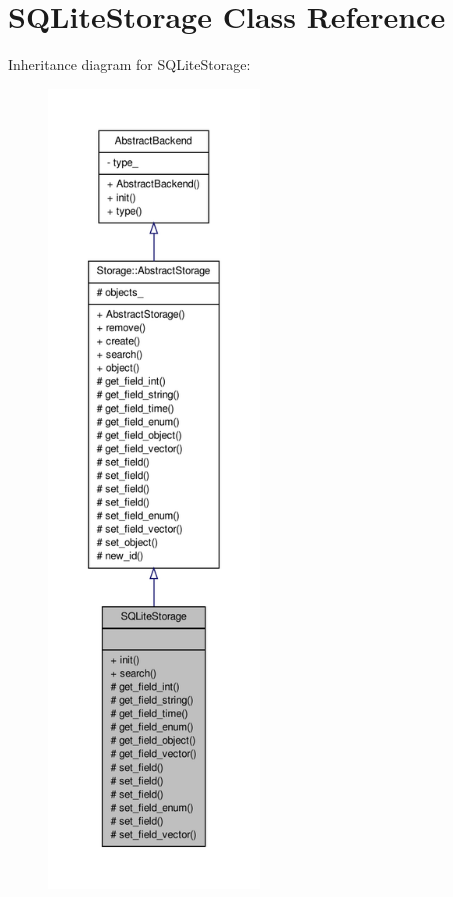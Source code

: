 \hypertarget{classSQLiteStorage}{
\section{SQLiteStorage Class Reference}
\label{db/d2a/classSQLiteStorage}
}


Inheritance diagram for SQLiteStorage:
\nopagebreak
\begin{figure}[H]
\begin{center}
\leavevmode
\includegraphics[height=600pt]{d1/d14/classSQLiteStorage__inherit__graph}
\end{center}
\end{figure}


